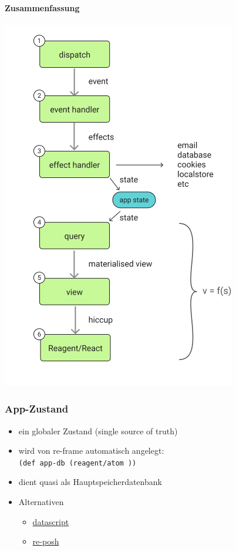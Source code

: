 \documentclass[a4paper]{article}
\begin{document}
\paragraph*{Zusammenfassung}
\label{sec:orgca6811d}
\begin{center}
\includegraphics[width=.9\linewidth]{./Abbildungen/6dominoes.png}
\end{center}
\subsubsection*{App-Zustand}
\label{sec:org46bb7e4}
\begin{itemize}
\item ein globaler Zustand (single source of truth)
\item wird von re-frame automatisch angelegt: \\
\texttt{(def app-db  (reagent/atom {}))}
\item dient quasi als Hauptspeicherdatenbank
\item Alternativen
\begin{itemize}
\item \href{https://github.com/tonsky/datascript}{datascript}
\item \href{https://github.com/denistakeda/re-posh}{re-posh}
\end{itemize}
\end{itemize}
\end{document}
